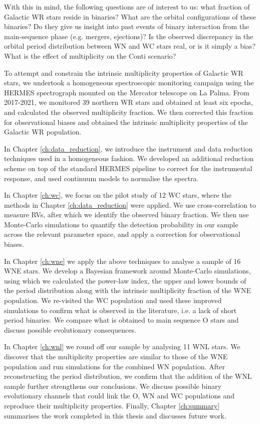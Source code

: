 With this in mind, the following questions are of interest to us: what fraction of Galactic WR stars reside in binaries? What are the orbital configurations of these binaries? Do they give us insight into past events of binary interaction from the main-sequence phase (e.g. mergers, ejections)? Is the observed discrepancy in the orbital period distribution between WN and WC stars real, or is it simply a bias? What is the effect of multiplicity on the Conti scenario?

To attempt and constrain the intrinsic multiplicity properties of Galactic WR stars, we undertook a homogeneous spectroscopic monitoring campaign using the HERMES spectrograph mounted on the Mercator telescope on La Palma. From 2017-2021, we monitored 39 northern WR stars and obtained at least six epochs, and calculated the observed multiplicity fraction. We then corrected this fraction for observational biases and obtained the intrinsic multiplicity properties of the Galactic WR population.

In Chapter \ref{ch:data_reduction}, we introduce the instrument and data reduction techniques used in a homogeneous fashion. We developed an additional reduction scheme on top of the standard HERMES pipeline to correct for the instrumental response, and used continuum models to normalise the spectra.

In Chapter \ref{ch:wc}, we focus on the pilot study of 12 WC stars, where the methods in Chapter \ref{ch:data_reduction} were applied. We use cross-correlation to measure RVs, after which we identify the observed binary fraction. We then use Monte-Carlo simulations to quantify the detection probability in our sample across the relevant parameter space, and apply a correction for observational biases.

In Chapter \ref{ch:wne} we apply the above techniques to analyse a sample of 16 WNE stars. We develop a Bayesian framework around Monte-Carlo simulations, using which we calculated the power-law index, the upper and lower bounds of the period distribution along with the intrinsic multiplicity fraction of the WNE population. We re-visited the WC population and used these improved simulations to confirm what is observed in the literature, i.e. a lack of short period binaries. We compare what is obtained to main sequence O stars and discuss possible evolutionary consequences.

In Chapter \ref{ch:wnl} we round off our sample by analysing 11 WNL stars. We discover that the multiplicity properties are similar to those of the WNE population and run simulations for the combined WN population. After reconstructing the period distribution, we confirm that the addition of the WNL sample further strengthens our conclusions. We discuss possible binary evolutionary channels that could link the O, WN and WC populations and reproduce their multiplicity properties. Finally, Chapter \ref{ch:summary} summarises the work completed in this thesis and discusses future work.


